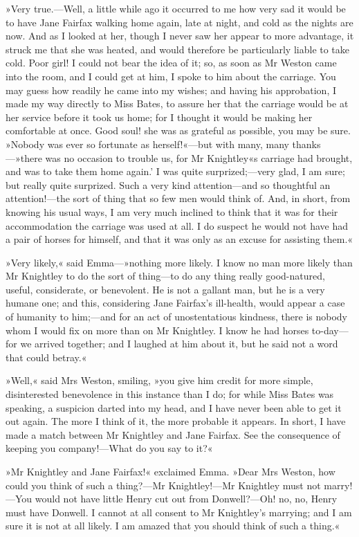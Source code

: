»Very true.—Well, a little while ago it occurred to me how very sad it would be to have Jane Fairfax walking home again, late at night, and cold as the nights are now. And as I looked at her, though I never saw her appear to more advantage, it struck me that she was heated, and would therefore be particularly liable to take cold. Poor girl! I could not bear the idea of it; so, as soon as Mr Weston came into the room, and I could get at him, I spoke to him about the carriage. You may guess how readily he came into my wishes; and having his approbation, I made my way directly to Miss Bates, to assure her that the carriage would be at her service before it took us home; for I thought it would be making her comfortable at once. Good soul! she was as grateful as possible, you may be sure. »Nobody was ever so fortunate as herself!«—but with many, many thanks—»there was no occasion to trouble us, for Mr Knightley«s carriage had brought, and was to take them home again.' I was quite surprized;—very glad, I am sure; but really quite surprized. Such a very kind attention—and so thoughtful an attention!—the sort of thing that so few men would think of. And, in short, from knowing his usual ways, I am very much inclined to think that it was for their accommodation the carriage was used at all. I do suspect he would not have had a pair of horses for himself, and that it was only as an excuse for assisting them.«

»Very likely,« said Emma—»nothing more likely. I know no man more likely than Mr Knightley to do the sort of thing—to do any thing really good-natured, useful, considerate, or benevolent. He is not a gallant man, but he is a very humane one; and this, considering Jane Fairfax's ill-health, would appear a case of humanity to him;—and for an act of unostentatious kindness, there is nobody whom I would fix on more than on Mr Knightley. I know he had horses to-day—for we arrived together; and I laughed at him about it, but he said not a word that could betray.«

»Well,« said Mrs Weston, smiling, »you give him credit for more simple, disinterested benevolence in this instance than I do; for while Miss Bates was speaking, a suspicion darted into my head, and I have never been able to get it out again. The more I think of it, the more probable it appears. In short, I have made a match between Mr Knightley and Jane Fairfax. See the consequence of keeping you company!—What do you say to it?«

»Mr Knightley and Jane Fairfax!« exclaimed Emma. »Dear Mrs Weston, how could you think of such a thing?—Mr Knightley!—Mr Knightley must not marry!—You would not have little Henry cut out from Donwell?—Oh! no, no, Henry must have Donwell. I cannot at all consent to Mr Knightley's marrying; and I am sure it is not at all likely. I am amazed that you should think of such a thing.«


